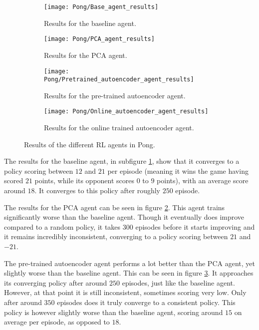 \begin{figure}[h]
	\centering
	\begin{subfigure}[b]{0.49\textwidth}
		\texttt{[image: Pong/Base\_agent\_results]}
		\caption{Results for the baseline agent.}
		\label{fig:results-base-pong} 
	\end{subfigure}
	\begin{subfigure}[b]{0.49\textwidth}
		\texttt{[image: Pong/PCA\_agent\_results]}
		\caption{Results for the PCA agent.}
		\label{fig:results-pca-pong}
	\end{subfigure}
	
	\medskip
	\begin{subfigure}[b]{0.49\textwidth}
		\texttt{[image: Pong/Pretrained\_autoencoder\_agent\_results]}
		\caption{Results for the pre-trained autoencoder agent.}
		\label{fig:results-ae-pong}
	\end{subfigure}	
	\begin{subfigure}[b]{0.49\textwidth}
		\texttt{[image: Pong/Online\_autoencoder\_agent\_results]}
		\caption{Results for the online trained autoencoder agent.}
		\label{fig:results-online-ae-pong}
	\end{subfigure}
	\caption{Results of the different RL agents in Pong.}
	\label{fig:results-agents-pong}
\end{figure}

The results for the baseline agent, in subfigure \ref{fig:results-base-pong}, show that it converges to a policy scoring between $12$ and $21$ per episode (meaning it wins the game having scored $21$ points, while its opponent scores $0$ to $9$ points), with an average score around $18$. It converges to this policy after roughly $250$ episode.

The results for the PCA agent can be seen in figure \ref{fig:results-pca-pong}. This agent trains significantly worse than the baseline agent. Though it eventually does improve compared to a random policy, it takes $300$ episodes before it starts improving and it remains incredibly inconsistent, converging to a policy scoring between $21$ and $-21$. %

The pre-trained autoencoder agent performs a lot better than the PCA agent, yet slightly worse than the baseline agent. This can be seen in figure \ref{fig:results-ae-pong}. It approaches its converging policy after around $250$ episodes, just like the baseline agent. However, at that point it is still inconsistent, sometimes scoring very low. Only after around $350$ episodes does it truly converge to a consistent policy. This policy is however slightly worse than the baseline agent, scoring around $15$ on average per episode, as opposed to $18$.

